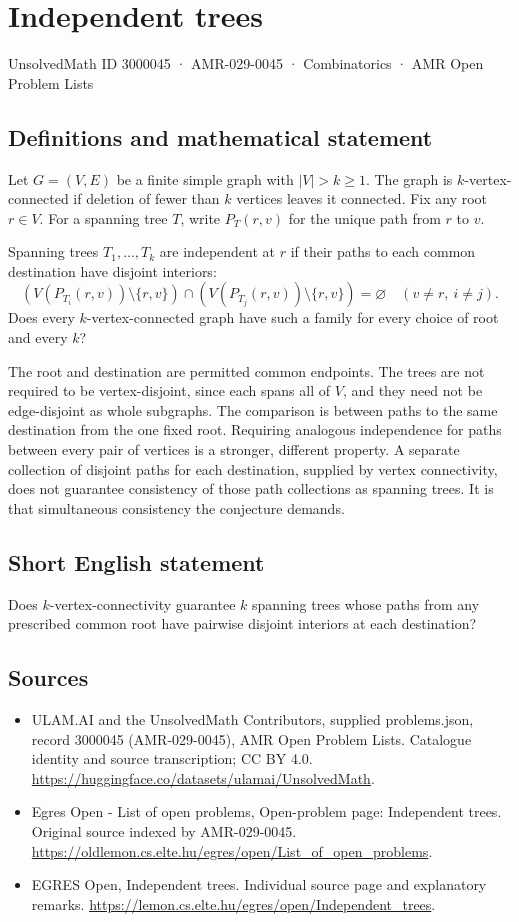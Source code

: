 \documentclass[11pt,a4paper]{article}
\begin{document}
\section*{Independent trees}\label{3000045}
{\small UnsolvedMath ID 3000045 · AMR-029-0045 · Combinatorics · AMR Open Problem Lists}
\subsection{Definitions and mathematical statement}
Let $G=(V,E)$ be a finite simple graph with $|V|>k\ge1$.
The graph is $k$-vertex-connected if deletion of fewer than $k$
vertices leaves it connected. Fix any root $r\in V$.
For a spanning tree $T$, write $P_T(r,v)$ for the unique path from
$r$ to $v$.

Spanning trees $T_1,\ldots,T_k$ are independent at $r$ if their paths
to each common destination have disjoint interiors:
\[
 (V(P_{T_i}(r,v))\setminus\{r,v\})\cap
 (V(P_{T_j}(r,v))\setminus\{r,v\})=\varnothing
                      \quad(v\ne r,\ i\ne j).
\]
Does every $k$-vertex-connected graph have such a family for every
choice of root and every $k$?

The root and destination are permitted common endpoints. The trees
are not required to be vertex-disjoint, since each spans all of $V$,
and they need not be edge-disjoint as whole subgraphs. The comparison
is between paths to the same destination from the one fixed root.
Requiring analogous independence for paths between every pair of
vertices is a stronger, different property. A separate collection
of disjoint paths for each destination, supplied by vertex connectivity,
does not guarantee consistency of those path collections as spanning
trees. It is that simultaneous consistency the conjecture demands.
\subsection{Short English statement}
Does $k$-vertex-connectivity guarantee $k$ spanning trees whose
paths from any prescribed common root have pairwise disjoint interiors at each destination?
\subsection{Sources}
\begin{itemize}
\item[S1] ULAM.AI and the UnsolvedMath Contributors, supplied problems.json, record 3000045 (AMR-029-0045), AMR Open Problem Lists. Catalogue identity and source transcription; CC BY 4.0.
\url{https://huggingface.co/datasets/ulamai/UnsolvedMath}.
\item[S2] Egres Open - List of open problems, Open-problem page: Independent trees. Original source indexed by AMR-029-0045.
\url{https://oldlemon.cs.elte.hu/egres/open/List_of_open_problems}.
\item[S3] EGRES Open, Independent trees. Individual source page and explanatory remarks.
\url{https://lemon.cs.elte.hu/egres/open/Independent_trees}.
\end{itemize}
\end{document}
